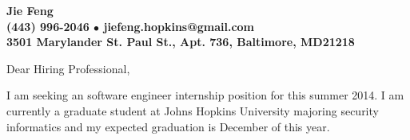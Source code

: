 \documentclass[11pt]{letter} %
\begin{document}

\begin{letter}{
} 


\begin{center}
\large\bf Jie Feng \\ %
 (443) 996-2046 $\bullet$ jiefeng.hopkins@gmail.com \\%
3501 Marylander St. Paul St., Apt. 736, Baltimore, MD21218 
\end{center} 
\vfill
\date{}
\vspace*{-40pt}
\signature{Jie Feng} %


\opening{Dear Hiring Professional,} 

I am seeking an software engineer internship position for this summer 2014.  I am currently a graduate student at Johns Hopkins University majoring security informatics and my expected graduation is December of this year.





\end{letter}
\end{document}
